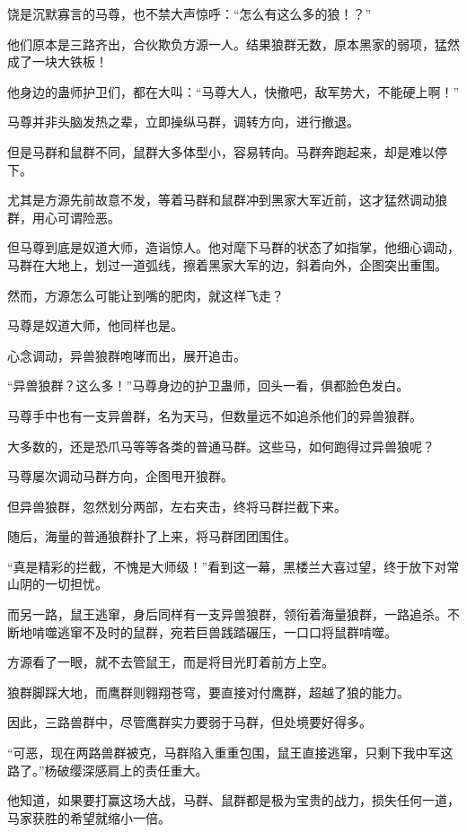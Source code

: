 \begin{this_body}
饶是沉默寡言的马尊，也不禁大声惊呼：“怎么有这么多的狼！？”

他们原本是三路齐出，合伙欺负方源一人。结果狼群无数，原本黑家的弱项，猛然成了一块大铁板！

他身边的蛊师护卫们，都在大叫：“马尊大人，快撤吧，敌军势大，不能硬上啊！”

马尊并非头脑发热之辈，立即操纵马群，调转方向，进行撤退。

但是马群和鼠群不同，鼠群大多体型小，容易转向。马群奔跑起来，却是难以停下。

尤其是方源先前故意不发，等着马群和鼠群冲到黑家大军近前，这才猛然调动狼群，用心可谓险恶。

但马尊到底是奴道大师，造诣惊人。他对麾下马群的状态了如指掌，他细心调动，马群在大地上，划过一道弧线，擦着黑家大军的边，斜着向外，企图突出重围。

然而，方源怎么可能让到嘴的肥肉，就这样飞走？

马尊是奴道大师，他同样也是。

心念调动，异兽狼群咆哮而出，展开追击。

“异兽狼群？这么多！”马尊身边的护卫蛊师，回头一看，俱都脸色发白。

马尊手中也有一支异兽群，名为天马，但数量远不如追杀他们的异兽狼群。

大多数的，还是恐爪马等等各类的普通马群。这些马，如何跑得过异兽狼呢？

马尊屡次调动马群方向，企图甩开狼群。

但异兽狼群，忽然划分两部，左右夹击，终将马群拦截下来。

随后，海量的普通狼群扑了上来，将马群团团围住。

“真是精彩的拦截，不愧是大师级！”看到这一幕，黑楼兰大喜过望，终于放下对常山阴的一切担忧。

而另一路，鼠王逃窜，身后同样有一支异兽狼群，领衔着海量狼群，一路追杀。不断地啃噬逃窜不及时的鼠群，宛若巨兽践踏碾压，一口口将鼠群啃噬。

方源看了一眼，就不去管鼠王，而是将目光盯着前方上空。

狼群脚踩大地，而鹰群则翱翔苍穹，要直接对付鹰群，超越了狼的能力。

因此，三路兽群中，尽管鹰群实力要弱于马群，但处境要好得多。

“可恶，现在两路兽群被克，马群陷入重重包围，鼠王直接逃窜，只剩下我中军这路了。”杨破缨深感肩上的责任重大。

他知道，如果要打赢这场大战，马群、鼠群都是极为宝贵的战力，损失任何一道，马家获胜的希望就缩小一倍。


\end{this_body}
